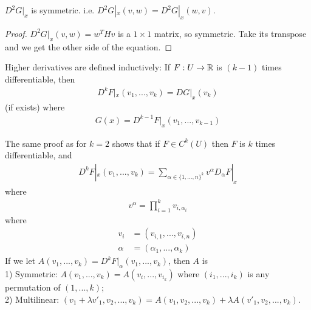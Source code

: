 \documentclass[a4paper]{article}
\begin{document}
\begin{coro}
$D^2 G|_x$ is symmetric. i.e. $D^2 G|_x(v,w) = D^2 G|_x(w,v)$.
\begin{proof}
$D^2G|_x (v,w)=w^THv$ is a $1\times 1$ matrix, so symmetric. Take its transpose and we get the other side of the equation.
\end{proof}
\end{coro}

Higher derivatives are defined inductively: If $F:U \to \mathbb{R}$ is $(k-1)$ times differentiable, then
\begin{equation*}
\begin{aligned}
D^k F|_x (v_1,...,v_k) = DG|_x(v_k)
\end{aligned}
\end{equation*}
(if exists) where
\begin{equation*}
\begin{aligned}
G(x)=D^{k-1} F|_x(v_1,...,v_{k-1})
\end{aligned}
\end{equation*}

The same proof as for $k=2$ shows that if $F \in C^k(U)$ then $F$ is $k$ times differentiable, and
\begin{equation*}
\begin{aligned}
D^k F|_x (v_1,...,v_k) = \sum_{\alpha\in\{1,...,n\}^k} v^\alpha D_\alpha F|_x
\end{aligned}
\end{equation*}
where
\begin{equation*}
\begin{aligned}
v^\alpha = \prod_{i=1}^k v_{i,\alpha_i}
\end{aligned}
\end{equation*}
where
\begin{equation*}
\begin{aligned}
v_i&=(v_{i,1},...,v_{i,n})\\
\alpha&=(\alpha_1,...,\alpha_k)
\end{aligned}
\end{equation*}
If we let $A(v_1,...,v_k)=D^kF|_\alpha (v_1,...,v_k)$, then $A$ is\\
1) Symmetric: $A(v_1,...,v_k) = A(v_i,...,v_{i_k})$ where $(i_1,...,i_k)$ is any permutation of $(1,...,k)$;\\
2) Multilinear: $(v_1+\lambda v'_1,v_2,...,v_k)=A(v_1,v_2,...,v_k)+\lambda A(v'_1,v_2,...,v_k)$.
\end{document}
